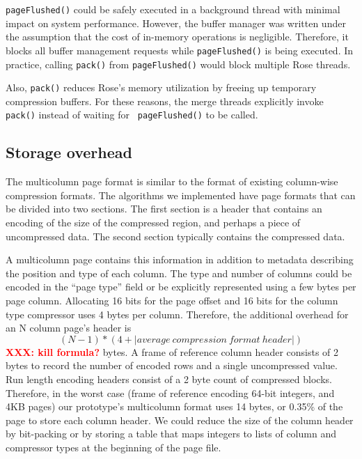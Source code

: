\documentclass{vldb}
\newcommand{\rows}{Rose\xspace}
\newcommand{\rowss}{Rose's\xspace}
\newcommand{\xxx}[1]{\textcolor{red}{\bf XXX: #1}}
\begin{document}
{\tt pageFlushed()} could be safely executed in a background thread
with minimal impact on system performance.  However, the buffer
manager was written under the assumption that the cost of in-memory
operations is negligible.  Therefore, it blocks all buffer management
requests while {\tt pageFlushed()} is being executed.  In practice,
calling {\tt pack()} from {\tt pageFlushed()} would block multiple
\rows threads.

Also, {\tt pack()} reduces \rowss memory utilization by freeing up
temporary compression buffers.
For these reasons, the merge threads
explicitly invoke {\tt pack()} instead of waiting for {\tt
  pageFlushed()} to be called.


\subsection{Storage overhead}

The multicolumn page format is similar to the format of existing
column-wise compression formats.  The algorithms we implemented have
page formats that can be divided into two sections.
The first section is a header that contains an encoding of the size of
the compressed region, and perhaps a piece of uncompressed data.  The second section
typically contains the compressed data.

A multicolumn page contains this information in addition to metadata
describing the position and type of each column.  The type and number
of columns could be encoded in the ``page type'' field or be
explicitly represented using a few bytes per page column.  Allocating
16 bits for the page offset and 16 bits for the column type compressor
uses 4 bytes per column.  Therefore, the additional overhead for an N
column page's header is
\[
   (N-1) * (4 + |average~compression~format~header|)
\]
\xxx{kill formula?}
bytes.  A frame of reference column header consists of 2 bytes to
record the number of encoded rows and a single uncompressed value. Run
length encoding headers consist of a 2 byte count of compressed
blocks.  Therefore, in the worst case (frame of reference encoding
64-bit integers, and 4KB pages) our prototype's multicolumn format
uses 14 bytes, or 0.35\% of the page to store each column header.  We
could reduce the size of the column header by bit-packing or by
storing a table that maps integers to lists of column and compressor
types at the beginning of the page file.
\end{document}
